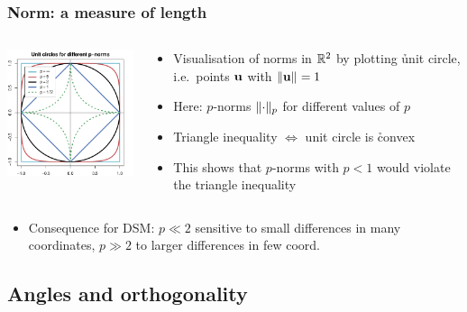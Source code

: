 \documentclass[t]{beamer} %
\begin{document}
\begin{frame}
  \frametitle{Norm: a measure of length}

  \ungap[1]
  \begin{columns}[T]
    \begin{column}{55mm}
      \includegraphics[width=55mm]{img/unit_circle_pnorms}%
    \end{column}
    \begin{column}{55mm}
      \begin{itemize}
       \item Visualisation of norms in $\setR^2$ by plotting \h{unit
           circle}, i.e.\ points $\vu$ with $\norm{\vu}=1$
       \item Here: $p$-norms $\norm[p]{\cdot}$ for different values of $p$%
       \item<2-> Triangle inequality $\iff$ unit circle is \h{convex}
       \item<2-> This shows that $p$-norms with $p < 1$ would violate the triangle
         inequality
      \end{itemize}
    \end{column}
  \end{columns}
  
  \gap[1]
  \begin{itemize}
  \item<3->[\hand] Consequence for DSM: $p \ll 2$ sensitive to small differences in many
    coordinates, $p \gg 2$ to larger differences in few coord.
  \end{itemize}
\end{frame}


\subsection{Angles and orthogonality}
\end{document}
